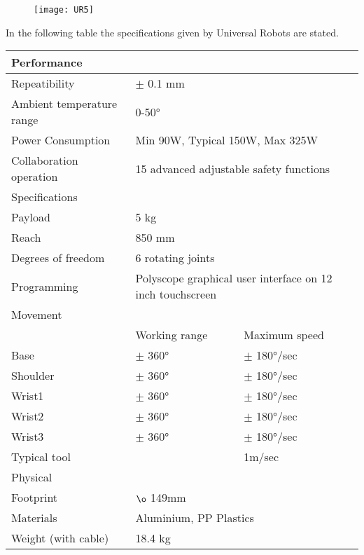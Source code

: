 \begin{figure}[htbp]
	\begin{center} 
		\texttt{[image: UR5]}
		\centering
		\label{fig:UR5} 
	\end{center}
\end{figure}

In the following table the specifications given by Universal Robots are stated. 
\begin{table}
	\begin{tabular}{p{4cm} | p{3cm} p{3cm}}
		\hline
		Performance & \multicolumn{2}{l}{ } \\
		\hline \hline
		Repeatibility & \multicolumn{2}{l}{$\pm$ 0.1 mm} \\
		Ambient temperature range & \multicolumn{2}{l}{0-50°} \\
		Power Consumption  & \multicolumn{2}{l}{Min 90W, Typical 150W, Max 325W} \\
		Collaboration operation & \multicolumn{2}{l}{15 advanced adjustable safety functions} \\
		\hline \hline
		Specifications & \multicolumn{2}{l}{ }\\
		\hline \hline 
		Payload & \multicolumn{2}{l}{5 kg} \\
		Reach & \multicolumn{2}{l}{850 mm} \\
		Degrees of freedom & \multicolumn{2}{l}{6 rotating joints} \\
		Programming & \multicolumn{2}{l}{Polyscope graphical user interface on 12 inch touchscreen} \\
		\hline \hline
		Movement & & \\
		\hline 
		& Working range & Maximum speed \\
		\hline \hline
		Base & $\pm$ 360°  & $\pm$ 180°/sec \\
		Shoulder & $\pm$ 360° & $\pm$ 180°/sec \\
		Wrist1 & $\pm$ 360° & $\pm$ 180°/sec \\
		Wrist2 & $\pm$ 360° & $\pm$ 180°/sec \\
		Wrist3 & $\pm$ 360° & $\pm$ 180°/sec \\
		Typical tool & & 1m/sec \\
		\hline \hline
		Physical & \multicolumn{2}{l}{ }\\
		\hline \hline
		Footprint & \multicolumn{2}{l}{$\o$ 149mm} \\
		Materials & \multicolumn{2}{l}{Aluminium, PP Plastics} \\
		Weight (with cable) & 18.4 kg 
	\end{tabular}
\end{table}

